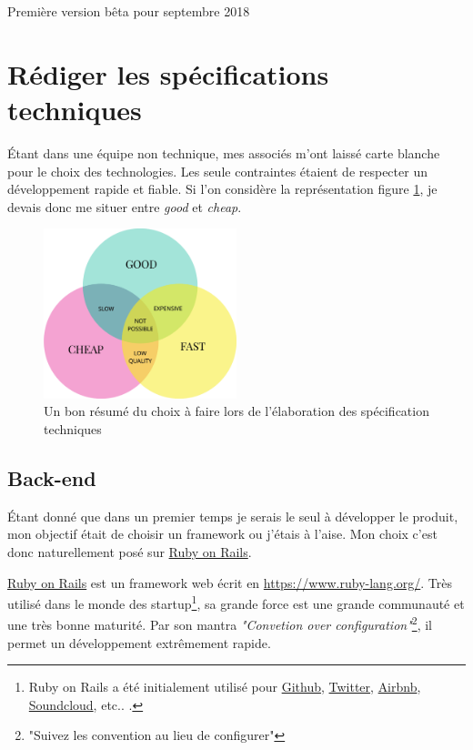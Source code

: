 \documentclass[]{report}
\begin{document}
      Première version bêta pour septembre 2018

  \section{Rédiger les spécifications techniques}

    Étant dans une équipe non technique, mes associés m'ont laissé carte blanche pour le choix des technologies. Les seule contraintes étaient de respecter un développement rapide et fiable. Si l'on considère la représentation figure \ref{fig:good_cheap_fast}, je devais donc me situer entre \textit{good} et \textit{cheap}.

    \begin{figure}
      \includegraphics[width=0.5\textwidth]{img/good_cheap_fast.png}
      \caption{Un bon résumé du choix à faire lors de l'élaboration des spécification techniques}
      \label{fig:good_cheap_fast}
    \end{figure}


    \subsection{Back-end}

      Étant donné que dans un premier temps je serais le seul à développer le produit, mon objectif était de choisir un framework ou j'étais à l'aise. Mon choix c'est donc naturellement posé sur \href{https://rubyonrails.org/}{Ruby on Rails}.

      \href{https://rubyonrails.org/}{Ruby on Rails} est un framework web écrit en \href{Ruby}{https://www.ruby-lang.org/}. Très utilisé dans le monde des startup\footnote{ Ruby on Rails a été initialement utilisé pour \href{https://github.com/}{Github}, \href{https://twitter.com/}{Twitter}, \href{https://airbnb.com/}{Airbnb}, \href{https://soundcloud.com/}{Soundcloud}, etc.. .}, sa grande force est une grande communauté et une très bonne maturité. Par son mantra \textit{"Convetion over configuration"}\footnote{"Suivez les convention au lieu de configurer"}, il permet un développement extrêmement rapide.
\end{document}
